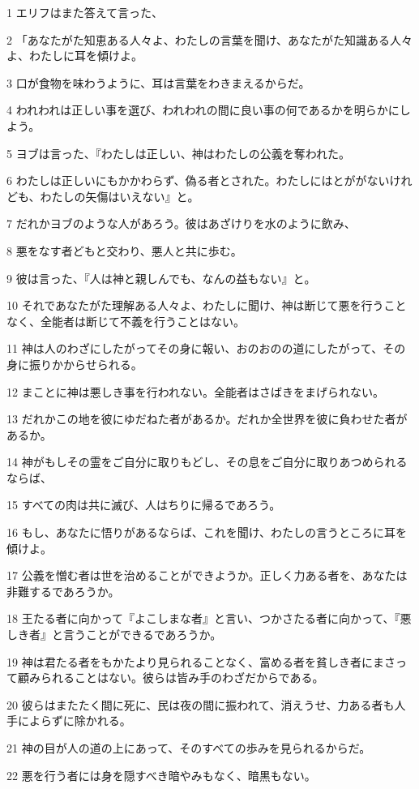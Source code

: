 \par 1 エリフはまた答えて言った、
\par 2 「あなたがた知恵ある人々よ、わたしの言葉を聞け、あなたがた知識ある人々よ、わたしに耳を傾けよ。
\par 3 口が食物を味わうように、耳は言葉をわきまえるからだ。
\par 4 われわれは正しい事を選び、われわれの間に良い事の何であるかを明らかにしよう。
\par 5 ヨブは言った、『わたしは正しい、神はわたしの公義を奪われた。
\par 6 わたしは正しいにもかかわらず、偽る者とされた。わたしにはとががないけれども、わたしの矢傷はいえない』と。
\par 7 だれかヨブのような人があろう。彼はあざけりを水のように飲み、
\par 8 悪をなす者どもと交わり、悪人と共に歩む。
\par 9 彼は言った、『人は神と親しんでも、なんの益もない』と。
\par 10 それであなたがた理解ある人々よ、わたしに聞け、神は断じて悪を行うことなく、全能者は断じて不義を行うことはない。
\par 11 神は人のわざにしたがってその身に報い、おのおのの道にしたがって、その身に振りかからせられる。
\par 12 まことに神は悪しき事を行われない。全能者はさばきをまげられない。
\par 13 だれかこの地を彼にゆだねた者があるか。だれか全世界を彼に負わせた者があるか。
\par 14 神がもしその霊をご自分に取りもどし、その息をご自分に取りあつめられるならば、
\par 15 すべての肉は共に滅び、人はちりに帰るであろう。
\par 16 もし、あなたに悟りがあるならば、これを聞け、わたしの言うところに耳を傾けよ。
\par 17 公義を憎む者は世を治めることができようか。正しく力ある者を、あなたは非難するであろうか。
\par 18 王たる者に向かって『よこしまな者』と言い、つかさたる者に向かって、『悪しき者』と言うことができるであろうか。
\par 19 神は君たる者をもかたより見られることなく、富める者を貧しき者にまさって顧みられることはない。彼らは皆み手のわざだからである。
\par 20 彼らはまたたく間に死に、民は夜の間に振われて、消えうせ、力ある者も人手によらずに除かれる。
\par 21 神の目が人の道の上にあって、そのすべての歩みを見られるからだ。
\par 22 悪を行う者には身を隠すべき暗やみもなく、暗黒もない。
